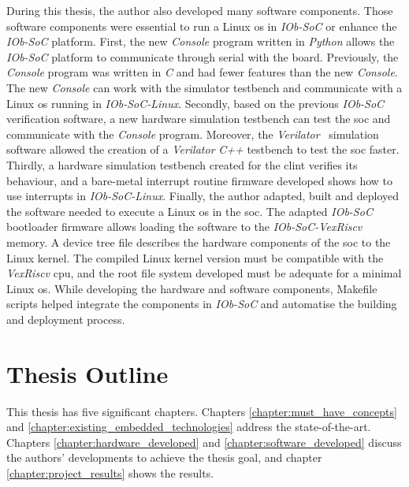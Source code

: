 During this thesis, the author also developed many software components. Those software components were essential to run a Linux \acrshort{os} in \textit{IOb-SoC} or enhance the \textit{IOb-SoC} platform. First, the new \textit{Console} program written in \textit{Python} allows the \textit{IOb-SoC} platform to communicate through serial with the board. Previously, the \textit{Console} program was written in \textit{C} and had fewer features than the new \textit{Console}. The new \textit{Console} can work with the simulator testbench and communicate with a Linux \acrshort{os} running in \textit{IOb-SoC-Linux}. Secondly, based on the previous \textit{IOb-SoC} verification software, a new hardware simulation testbench can test the \acrshort{soc} and communicate with the \textit{Console} program. Moreover, the \textit{Verilator}~\cite{snyder2010verilator} simulation software allowed the creation of a \textit{Verilator} \textit{C++} testbench to test the \acrshort{soc} faster. Thirdly, a hardware simulation testbench created for the \acrshort{clint} verifies its behaviour, and a bare-metal interrupt routine firmware developed shows how to use interrupts in \textit{IOb-SoC-Linux}. Finally, the author adapted, built and deployed the software needed to execute a Linux \acrshort{os} in the \acrshort{soc}. The adapted \textit{IOb-SoC} bootloader firmware allows loading the software to the \textit{IOb-SoC-VexRiscv} memory. A device tree file describes the hardware components of the \acrshort{soc} to the Linux kernel. The compiled Linux kernel version must be compatible with the \textit{VexRiscv} \acrshort{cpu}, and the root file system developed must be adequate for a minimal Linux \acrshort{os}. While developing the hardware and software components, Makefile scripts helped integrate the components in \textit{IOb-SoC} and automatise the building and deployment process.

\section{Thesis Outline}
\label{section:thesis_outline}
This thesis has five significant chapters. Chapters \ref{chapter:must_have_concepts} and \ref{chapter:existing_embedded_technologies} address the state-of-the-art. Chapters \ref{chapter:hardware_developed} and \ref{chapter:software_developed} discuss the authors' developments to achieve the thesis goal, and chapter \ref{chapter:project_results} shows the results.

